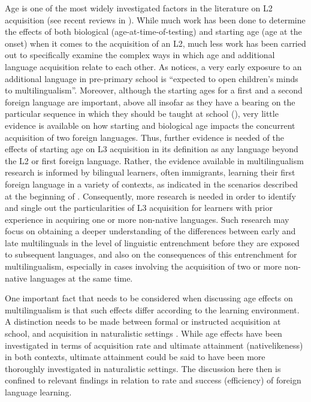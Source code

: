\documentclass[output=paper]{../langscibook}
\begin{document}
Age is one of the most widely investigated factors in the literature on L2 acquisition (see recent reviews in \citealt{PfenningerSingleton2017, SingletonPfenninger2018, Muñoz2019, MuñozSingleton2019}). While much work has been done to determine the effects of both biological (age-at-time-of-testing) and starting age (age at the onset) when it comes to the acquisition of an L2, much less work has been carried out to specifically examine the complex ways in which age and additional language acquisition relate to each other. As \citet[433]{Muñoz2019} notices, a very early exposure to an additional language in pre-primary school is “expected to open children’s minds to multilingualism”. Moreover, although the starting ages for a first and a second foreign language are important, above all insofar as they have a bearing on the particular sequence in which they should be taught at school (\citealt[222]{MuñozSingleton2019}), very little evidence is available on how starting and biological age impacts the concurrent acquisition of two foreign languages. Thus, further evidence is needed of the effects of starting age on L3 acquisition in its definition as any language beyond the L2 or first foreign language. Rather, the evidence available in multilingualism research is informed by bilingual learners, often immigrants, learning their first foreign language in a variety of contexts, as indicated in the scenarios described at the beginning of . Consequently, more research is needed in order to identify and single out the particularities of L3 acquisition for learners with prior experience in acquiring one or more non-native languages. Such research may focus on obtaining a deeper understanding of the differences between early and late multilinguals in the level of linguistic entrenchment before they are exposed to subsequent languages, and also on the consequences of this entrenchment for multilingualism, especially in cases involving the acquisition of two or more non-native languages at the same time.

One important fact that needs to be considered when discussing age effects on multilingualism is that such effects differ according to the learning environment. A distinction needs to be made between formal or instructed acquisition at school, and acquisition in naturalistic settings \citep{Bardel2019}. While age effects have been investigated in terms of acquisition rate and ultimate attainment (nativelikeness) in both contexts, ultimate attainment could be said to have been more thoroughly investigated in naturalistic settings. The discussion here then is confined to relevant findings in relation to rate and success (efficiency) of foreign language learning.
\end{document}
